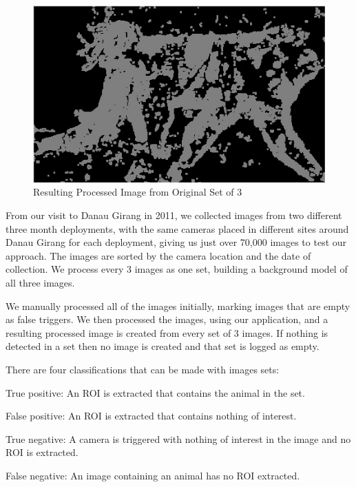 			\begin{figure}[h]
			\centering
			\includegraphics[width=\textwidth]{Chap3/figures/PROC_IMG_0568}
			\caption{Resulting Processed Image from Original Set of 3}
			\label{tech:reconyx:processed}
			\end{figure}
	
		From our visit to Danau Girang in 2011, we collected images from two different three month deployments, with the same cameras placed in different sites around Danau Girang for each deployment, giving us just over 70,000 images to test our approach. The images are sorted by the camera location and the date of collection. We process every 3 images as one set, building a background model of all three images.
		
		We manually processed all of the images initially, marking images that are empty as false triggers. We then processed the images, using our application, and a resulting processed image is created from every set of 3 images. If nothing is detected in a set then no image is created and that set is logged as empty. 
		
		There are four classifications that can be made with images sets:
		\begin{description}
			\item True positive: An ROI is extracted that contains the animal in the set.
			\item False positive: An ROI is extracted that contains nothing of interest.
			\item True negative: A camera is triggered with nothing of interest in the image and no ROI is extracted.
			\item False negative: An image containing an animal has no ROI extracted.
		\end{description}
		
